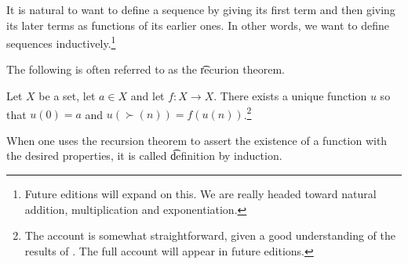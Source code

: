 

It is natural to want to define a sequence by giving its first term and then giving its later terms as functions of its earlier ones.
In other words, we want to define sequences inductively.\footnote{Future editions will expand on this. We are really headed toward natural addition, multiplication and exponentiation.}


The following is often referred to as the \t{recurion theorem}.

\begin{proposition}
Let $X$ be a set, let $a \in X$ and let $f: X \to X$.
  There exists a unique function $u$ so that $u(0) = a$ and $u(\succ(n)) = f(u(n))$.\footnote{The account is somewhat straightforward, given a good understanding of the results of . The full account will appear in future editions.}
\end{proposition}

When one uses the recursion theorem to assert the existence of a function with the desired properties, it is called \t{definition by induction}.

\blankpage
